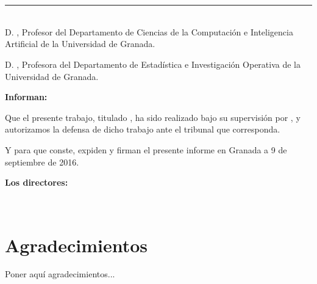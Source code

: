\chapter*{}
\thispagestyle{empty}

\noindent\rule[-1ex]{\textwidth}{2pt}\\[4.5ex]

D. \textbf{ \myProf }, Profesor del Departamento de Ciencias de la Computación e Inteligencia Artificial de la Universidad de Granada.

\vspace{0.5cm}

D. \textbf{ \myOtherProf}, Profesora del Departamento de Estadística e Investigación Operativa de la Universidad de Granada.


\vspace{0.5cm}

\textbf{Informan:}

\vspace{0.5cm}

Que el presente trabajo, titulado \textit{\textbf{\myTitle}},
ha sido realizado bajo su supervisión por \textbf{\myName}, y autorizamos la defensa de dicho trabajo ante el tribunal
que corresponda.

\vspace{0.5cm}

Y para que conste, expiden y firman el presente informe en Granada a 9 de septiembre de 2016.

\vspace{1cm}

\textbf{Los directores:}

\vspace{5cm}

\noindent \textbf{\myProf \ \ \ \ \ \ \myOtherProf}

\chapter*{Agradecimientos}
\thispagestyle{empty}

       \vspace{1cm}


Poner aquí agradecimientos...

